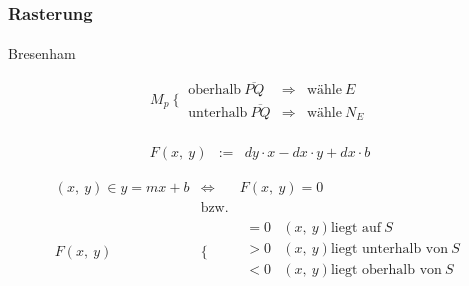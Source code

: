 \documentclass{beamer}
\begin{document}
\begin{frame}
    \frametitle{Rasterung}
\framesubtitle{}
\begin{block}{Bresenham}

    \begin{equation*}
        M_p ~\Big\{~ \begin{matrix}
            \textrm{oberhalb}~ \overline{PQ} &\Rightarrow& \textrm{wähle}~ E \\ 
            \textrm{unterhalb}~ \overline{PQ} &\Rightarrow& \textrm{wähle}~ N_E 
        \end{matrix}
    \end{equation*}\\
  
    \begin{equation*}\begin{matrix}
        F\left(x,~ y\right) & := & dy \cdot x - dx \cdot y + dx \cdot b 
    \end{matrix}\end{equation*}

\begin{equation*}
\begin{matrix}
        (x,~ y) \in y = mx + b & \Leftrightarrow & F\left(x,~ y\right) = 0 \\
        & \textrm{bzw.} & \\
        F\left(x,~ y\right) & \Bigg\{ & \begin{matrix}
            = 0 & \left(x,~ y\right) \textrm{liegt auf}~ S \\
            > 0 & \left(x,~ y\right) \textrm{liegt unterhalb von}~ S \\
            < 0 & \left(x,~ y\right) \textrm{liegt oberhalb von}~ S \\
        \end{matrix}
    \end{matrix}\end{equation*}
   \end{block}
\end{frame}
\end{document}
